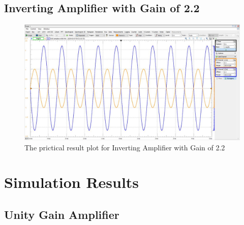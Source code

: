 \documentclass{article}
\begin{document}
	\subsection{Inverting Amplifier with Gain of 2.2}
	\begin{figure}[H]
		\centering
		\includegraphics[width=1\textwidth]{gain2_4.jpg}
		\caption{The prictical result plot for Inverting Amplifier with Gain of 2.2}
		\label{fig:2_4Gain}
	\end{figure}

	
	\section{Simulation Results}
	
	
	\subsection{Unity Gain Amplifier}
\end{document}
